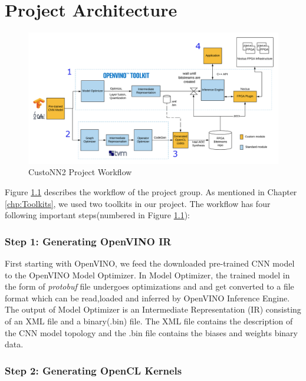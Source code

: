 \chapter{Project Architecture}
 \begin{figure}
    \centering
    \includegraphics[scale=1,width=\textwidth]{img/CustoNN2_Workflow_New.png}
    \caption{CustoNN2 Project Workflow}
    \label{fig:custonn2_workflow}
\end{figure}
Figure \ref{fig:custonn2_workflow} describes the workflow of the project group. As mentioned in Chapter \ref{chp:Toolkits}, we used two toolkits in our project. The workflow has four following important steps(numbered in Figure \ref{fig:custonn2_workflow}):
\subsection*{Step 1: Generating OpenVINO IR}
First starting with OpenVINO, we feed the downloaded pre-trained CNN model to the OpenVINO Model Optimizer. In Model Optimizer, the trained model in the form of \textit{protobuf} file undergoes optimizations and and get converted to a file format which can be read,loaded and inferred by OpenVINO Inference Engine. The output of Model Optimizer is an Intermediate Representation (IR) consisting of an XML file and a binary(.bin) file. The XML file contains the description of the CNN model topology and the .bin file contains the biases and weights binary data. 
 
\subsection*{Step 2: Generating OpenCL Kernels}

